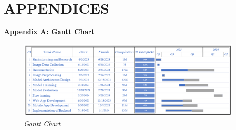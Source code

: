 \section{APPENDICES}
\textbf{Appendix A: Gantt Chart }
\begin{figure}[h]
    \centering
    \includegraphics[width= 6.3in ]{img/Gantt_Chart.png}
    \caption{\textit{Gantt Chart}}
\end{figure}